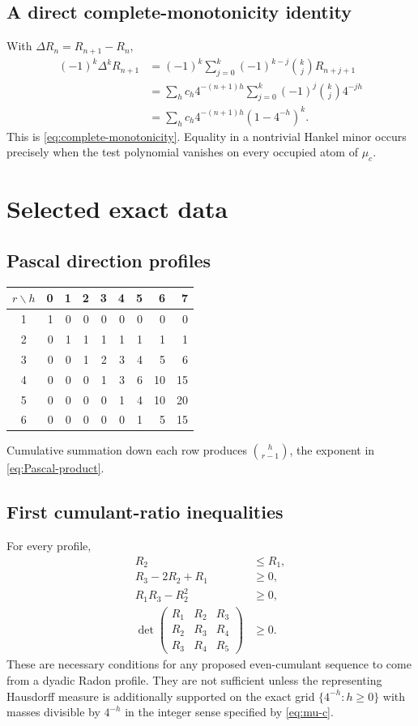 \documentclass[11pt]{article}
\numberwithin{equation}{section}
\theoremstyle{definition}
\theoremstyle{remark}
\begin{document}
\subsection{A direct complete-monotonicity identity}

With $\Delta R_n=R_{n+1}-R_n$,
\begin{align*}
 (-1)^k\Delta^kR_{n+1}
 &=(-1)^k\sum_{j=0}^{k}(-1)^{k-j}\binom{k}{j}R_{n+j+1}\\
 &=\sum_hc_h4^{-(n+1)h}
   \sum_{j=0}^{k}(-1)^j\binom{k}{j}4^{-jh}\\
 &=\sum_hc_h4^{-(n+1)h}(1-4^{-h})^k.
\end{align*}
This is \eqref{eq:complete-monotonicity}.  Equality in a nontrivial Hankel
minor occurs precisely when the test polynomial vanishes on every occupied
atom of $\mu_c$.

\section{Selected exact data}
\label{app:data}

\subsection{Pascal direction profiles}

\begin{center}
\begin{tabular}{@{}crrrrrrrr@{}}
\toprule
$r\backslash h$ & 0&1&2&3&4&5&6&7 \\
\midrule
1&1&0&0&0&0&0&0&0\\
2&0&1&1&1&1&1&1&1\\
3&0&0&1&2&3&4&5&6\\
4&0&0&0&1&3&6&10&15\\
5&0&0&0&0&1&4&10&20\\
6&0&0&0&0&0&1&5&15\\
\bottomrule
\end{tabular}
\end{center}
Cumulative summation down each row produces
$\binom{h}{r-1}$, the exponent in \eqref{eq:Pascal-product}.

\subsection{First cumulant-ratio inequalities}

For every profile,
\begin{align*}
 R_2&\le R_1,\\
 R_3-2R_2+R_1&\ge0,\\
 R_1R_3-R_2^2&\ge0,\\
 \det\begin{pmatrix}R_1&R_2&R_3\\ R_2&R_3&R_4\\ R_3&R_4&R_5\end{pmatrix}&\ge0.
\end{align*}
These are necessary conditions for any proposed even-cumulant sequence to come
from a dyadic Radon profile.  They are not sufficient unless the representing
Hausdorff measure is additionally supported on the exact grid
$\{4^{-h}:h\ge0\}$ with masses divisible by $4^{-h}$ in the integer sense
specified by \eqref{eq:mu-c}.
\end{document}
